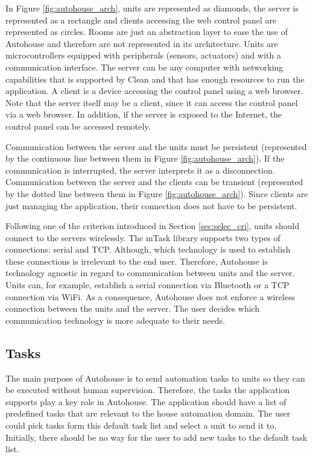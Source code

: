In Figure \ref{fig:autohouse_arch}, units are represented as diamonds, the server is represented as a rectangle and clients accessing the web control panel are represented as circles. Rooms are just an abstraction layer to ease the use of Autohouse and therefore are not represented in its architecture. Units are microcontrollers equipped with peripherals (sensors, actuators) and with a communication interface. The server can be any computer with networking capabilities that is supported by Clean and that has enough resources to run the application. A client is a device accessing the control panel using a web browser. Note that the server itself may be a client, since it can access the control panel via a web browser. In addition, if the server is exposed to the Internet, the control panel can be accessed remotely. 

Communication between the server and the units must be persistent (represented by the continuous line between them in Figure \ref{fig:autohouse_arch}). If the communication is interrupted, the server interprets it as a disconnection. Communication between the server and the clients can be transient (represented by the dotted line between them in Figure \ref{fig:autohouse_arch}). Since clients are just managing the application, their connection does not have to be persistent. 

Following one of the criterion introduced in Section \ref{sec:selec_cri}, units should connect to the servers wirelessly. The mTask library supports two types of connections: serial and TCP. Although, which technology is used to establish these connections is irrelevant to the end user. Therefore, Autohouse is technology agnostic in regard to communication between units and the server. Units can, for example, establish a serial connection via Bluetooth or a TCP connection via WiFi. As a consequence, Autohouse does not enforce a wireless connection between the units and the server. The user decides which communication technology is more adequate to their needs.

\subsection{Tasks}

The main purpose of Autohouse is to send automation tasks to units so they can be executed without human supervision. Therefore, the tasks the application supports play a key role in Autohouse. The application should have a list of predefined tasks that are relevant to the house automation domain. The user could pick tasks form this default task list and select a unit to send it to. Initially, there should be no way for the user to add new tasks to the default task list.

